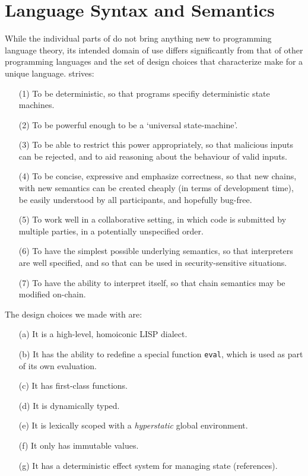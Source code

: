 \section{Language Syntax and Semantics}
\label{s:language}

While the individual parts of \rad{} do not bring anything
new to programming language theory, its intended domain of use
differs significantly from that of other programming languages and the set of
design choices that characterize \rad{} make for a unique language. \rad{} strives:
\begin{itemize}
\item[(1)] To be deterministic, so that \rad{} programs specifiy deterministic
  state machines.
\item[(2)] To be powerful enough to be a `universal state-machine'.
\item[(3)] To be able to restrict this power appropriately, so that malicious
  inputs can be rejected, and to aid reasoning about the behaviour of valid
  inputs.
\item[(4)] To be concise, expressive and emphasize correctness, so that new
  chains, with new semantics can be created cheaply (in terms of development
  time), be easily understood by all participants, and hopefully bug-free.
\item[(5)] To work well in a collaborative setting, in which code is submitted
  by multiple parties, in a potentially unspecified order.
\item[(6)] To have the simplest possible underlying semantics, so
  that \rad{} interpreters are well specified, and so that \rad{} can be used in
  security-sensitive situations.
\item[(7)] To have the ability to interpret itself, so that chain semantics may
  be modified on-chain.
\end{itemize}

The design choices we made with \rad{} are:
\begin{itemize}
\item[(a)] It is a high-level, homoiconic LISP dialect.
\item[(b)] It has the ability to redefine a special function \texttt{eval}, which
  is used as part of its own evaluation.
\item[(c)] It has first-class functions.
\item[(d)] It is dynamically typed.
\item[(e)] It is lexically scoped with a \emph{hyperstatic} global environment.
\item[(f)] It only has immutable values.
\item[(g)] It has a deterministic effect system for managing state (references).
\end{itemize}

